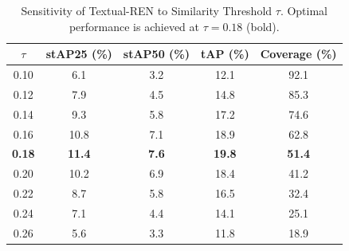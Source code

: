 \begin{table}[t]
\centering
\caption{Sensitivity of Textual-REN to Similarity Threshold $\tau$.
  Optimal performance is achieved at $\tau{=}0.18$ (bold).}
\label{tab:threshold}
\begin{tabular}{ccccc}
\toprule
$\tau$ & \textbf{stAP25} (\%) & \textbf{stAP50} (\%) & \textbf{tAP} (\%) & \textbf{Coverage} (\%) \\
\midrule
0.10 &  6.1 & 3.2 & 12.1 & 92.1 \\
0.12 &  7.9 & 4.5 & 14.8 & 85.3 \\
0.14 &  9.3 & 5.8 & 17.2 & 74.6 \\
0.16 & 10.8 & 7.1 & 18.9 & 62.8 \\
\textbf{0.18} & \textbf{11.4} & \textbf{7.6} & \textbf{19.8} & \textbf{51.4} \\
0.20 & 10.2 & 6.9 & 18.4 & 41.2 \\
0.22 &  8.7 & 5.8 & 16.5 & 32.4 \\
0.24 &  7.1 & 4.4 & 14.1 & 25.1 \\
0.26 &  5.6 & 3.3 & 11.8 & 18.9 \\
\bottomrule
\end{tabular}
\end{table}
